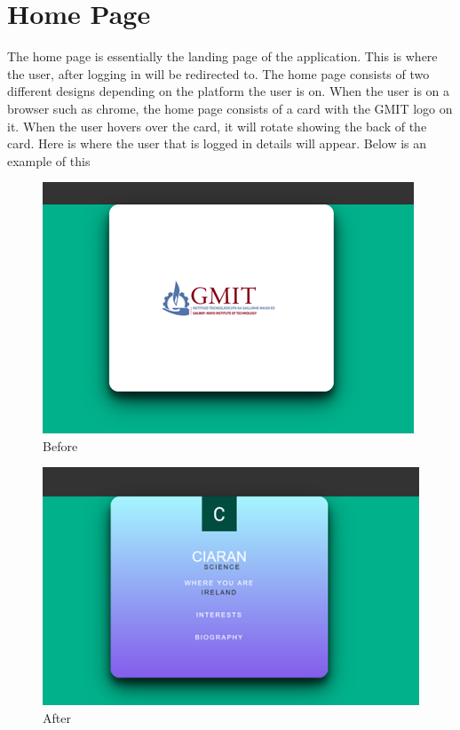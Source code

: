 \section{Home Page}
The home page is essentially the landing page of the application. This is where the user, after logging in will be redirected to. The home page consists of two different designs depending on the platform the user is on. When the user is on a browser such as chrome, the home page consists of a card with the GMIT logo on it. When the user hovers over the card, it will rotate showing the back of the card. Here is where the user that is logged in details will appear. Below is an example of this\\

\begin{figure}[H]
    \centering
    \includegraphics{img/Home1.png}
    \caption{Before}
    \label{fig:my_label}
\end{figure}

\begin{figure}[H]
    \centering
    \includegraphics{img/Home2.png}
    \caption{After}
    \label{fig:my_label}
\end{figure}

